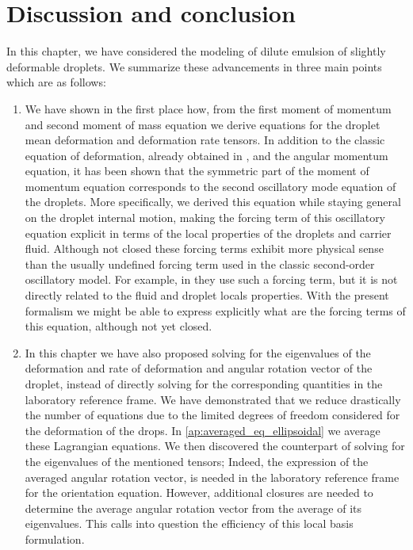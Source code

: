 \section{Discussion and conclusion}

In this chapter, we have considered the modeling of dilute emulsion of slightly deformable droplets. 
We summarize these advancements in three main points which are as follows: 
\begin{enumerate}
    \item We have shown in the first place how, from the first moment of momentum and second moment of mass equation we derive equations for the droplet mean deformation and deformation rate tensors. 
In addition to the classic equation of deformation, already obtained in \citet{goddard1967nonlinear},  and the angular momentum equation, it has been shown that the symmetric part of the moment of momentum equation corresponds to the second oscillatory mode equation of the droplets. 
More specifically, we derived this equation while staying general on the droplet internal motion, making the forcing term of this oscillatory equation explicit in terms of the local properties of the droplets and carrier fluid. 
Although not closed these forcing terms exhibit more physical sense than the usually undefined forcing term used in the classic second-order oscillatory model.
For example, in \citet{riviere2021sub} they use such a forcing term, but it is not directly related to the fluid and droplet locals properties.
With the present formalism we might be able to express explicitly what are the forcing terms of this equation, although not yet closed. 

\item 
In this chapter we have also proposed solving for the eigenvalues of the deformation and rate of deformation and angular rotation vector of the droplet, instead of directly solving for the corresponding quantities in the laboratory reference frame. 
We have demonstrated that we reduce drastically the number of equations due to the limited degrees of freedom considered for the deformation of the drops. 
In \ref{ap:averaged_eq_ellipsoidal} we average these Lagrangian equations. 
We then discovered the counterpart of solving for the eigenvalues of the mentioned tensors; 
Indeed, the expression of the averaged angular rotation vector, is needed in the laboratory reference frame for the orientation equation. 
However, additional closures are needed to determine the average angular rotation vector from the average of its eigenvalues.  
This calls into question the efficiency of this local basis formulation. 


\end{enumerate}

